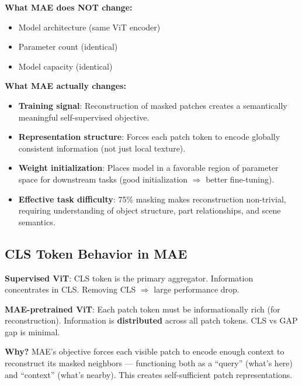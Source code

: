 \textbf{What MAE does NOT change:}
\begin{itemize}
\item Model architecture (same ViT encoder)
\item Parameter count (identical)
\item Model capacity (identical)
\end{itemize}

\textbf{What MAE actually changes:}
\begin{itemize}
\item \textbf{Training signal}: Reconstruction of masked patches creates a semantically meaningful self-supervised objective.
\item \textbf{Representation structure}: Forces each patch token to encode globally consistent information (not just local texture).
\item \textbf{Weight initialization}: Places model in a favorable region of parameter space for downstream tasks (good initialization $\Rightarrow$ better fine-tuning).
\item \textbf{Effective task difficulty}: 75\% masking makes reconstruction non-trivial, requiring understanding of object structure, part relationships, and scene semantics.
\end{itemize}

\subsection{CLS Token Behavior in MAE}

\textbf{Supervised ViT}: CLS token is the primary aggregator. Information concentrates in CLS. Removing CLS $\Rightarrow$ large performance drop.

\textbf{MAE-pretrained ViT}: Each patch token must be informationally rich (for reconstruction). Information is \textbf{distributed} across all patch tokens. CLS vs GAP gap is minimal.

\textbf{Why?} MAE's objective forces each visible patch to encode enough context to reconstruct its masked neighbors — functioning both as a ``query'' (what's here) and ``context'' (what's nearby). This creates self-sufficient patch representations.

